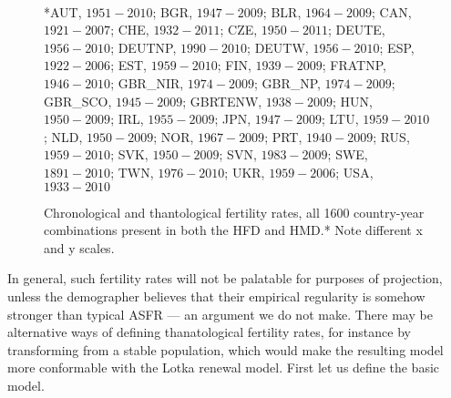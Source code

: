 \documentclass{article}
\begin{document}
\begin{figure}[h!]
	\caption{Chronological and thantological fertility rates, all 1600
	country-year combinations present in both the HFD and HMD.* Note different x
	and y scales.}
	\label{fig:Fxcompare}
	\begin{center}
	\\
	\end{center}
	\begin{tiny}
	*AUT, $1951-2010$; BGR, $1947-2009$; BLR, $1964-2009$; CAN, $1921-2007$; 
	CHE, $1932-2011$; CZE, $1950-2011$; DEUTE, $1956-2010$; DEUTNP, $1990-2010$; 
	DEUTW, $1956-2010$; ESP, $1922-2006$; EST, $1959-2010$; FIN, $1939-2009$; 
	FRATNP, $1946-2010$; GBR\_NIR, $1974-2009$; GBR\_NP, $1974-2009$; GBR\_SCO,
	$1945-2009$; GBRTENW, $1938-2009$; HUN, $1950-2009$; IRL, $1955-2009$; JPN, $1947-2009$; 
	LTU, $1959-2010$; NLD, $1950-2009$; NOR, $1967-2009$; PRT, $1940-2009$; 
	RUS, $1959-2010$; SVK, $1950-2009$; SVN, $1983-2009$; SWE, $1891-2010$; 
	TWN, $1976-2010$; UKR, $1959-2006$; USA, $1933-2010$
	\end{tiny}
\end{figure}

In general, such fertility rates will not be palatable for purposes of
projection, unless the demographer believes that their empirical regularity is
somehow stronger than typical ASFR --- an argument we do not make. There may be
alternative ways of defining thanatological fertility rates, for instance by
transforming from a stable population, which would make the resulting model more
conformable with the Lotka renewal model. First let us define the basic model.

\FloatBarrier
\end{document}
